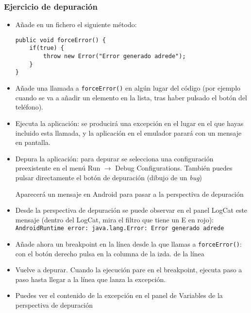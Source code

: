 \documentclass[hyperref={pdfpagelabels=true},utf8x]{beamer}
\begin{document}
\begin{frame}[fragile,shrink=33.83]
\frametitle{Ejercicio de depuración}

\begin{itemize}
\item Añade en un fichero el siguiente método:

\lstset{language=java}
\begin{lstlisting}
public void forceError() {
    if(true) {
        throw new Error("Error generado adrede");
    }
}
\end{lstlisting}

\item Añade una llamada a \verb|forceError()| en algún lugar del código (por
ejemplo cuando se va a añadir un elemento en la lista, tras haber
pulsado el botón del teléfono).

\item Ejecuta la aplicación: se producirá una excepción en el lugar en el
que hayas incluido esta llamada, y la aplicación en el emulador parará
con un mensaje en pantalla.

\item Depura la aplicación: para depurar se selecciona una configuración
preexistente en el menú Run $\rightarrow$ Debug
Configurations. También puedes pulsar directamente el botón de
depuración (dibujo de un \emph{bug})

Aparecerá un mensaje en Android para pasar a la perspectiva de depuración

\item Desde la perspectiva de depuración se puede observar en el panel
LogCat este mensaje (dentro del LogCat, mira el filtro que tiene un E
en rojo): \verb|AndroidRuntime error: java.lang.Error: Error generado adrede|

\item Añade ahora un breakpoint en la línea desde la que llamas a
\verb|forceError()|: con el botón derecho pulsa en la columna de la
izda. de la línea

\item Vuelve a depurar. Cuando la ejecución pare en el breakpoint, ejecuta
paso a paso hasta llegar a la línea que lanza la excepción. 

\item Puedes ver el contenido de la excepción en el panel de Variables de la
perspectiva de depuración
\end{itemize}

\end{frame}
\end{document}
